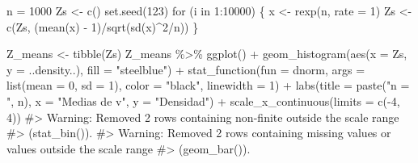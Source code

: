 \documentclass[
  letterpaper,
  DIV=11,
  numbers=noendperiod,
  oneside]{scrreprt}
\newenvironment{Shaded}{\begin{snugshade}}{\end{snugshade}}
\newcommand{\AttributeTok}[1]{\textcolor[rgb]{0.40,0.45,0.13}{#1}}
\newcommand{\CommentTok}[1]{\textcolor[rgb]{0.37,0.37,0.37}{#1}}
\newcommand{\ControlFlowTok}[1]{\textcolor[rgb]{0.00,0.23,0.31}{#1}}
\newcommand{\DecValTok}[1]{\textcolor[rgb]{0.68,0.00,0.00}{#1}}
\newcommand{\FunctionTok}[1]{\textcolor[rgb]{0.28,0.35,0.67}{#1}}
\newcommand{\NormalTok}[1]{\textcolor[rgb]{0.00,0.23,0.31}{#1}}
\newcommand{\OtherTok}[1]{\textcolor[rgb]{0.00,0.23,0.31}{#1}}
\newcommand{\SpecialCharTok}[1]{\textcolor[rgb]{0.37,0.37,0.37}{#1}}
\newcommand{\StringTok}[1]{\textcolor[rgb]{0.13,0.47,0.30}{#1}}
\begin{document}
\begin{Shaded}
\begin{Highlighting}[]
\NormalTok{n }\OtherTok{=} \DecValTok{1000}
\NormalTok{Zs }\OtherTok{\textless{}{-}} \FunctionTok{c}\NormalTok{()}
\FunctionTok{set.seed}\NormalTok{(}\DecValTok{123}\NormalTok{)}
\ControlFlowTok{for}\NormalTok{ (i }\ControlFlowTok{in} \DecValTok{1}\SpecialCharTok{:}\DecValTok{10000}\NormalTok{) \{}
\NormalTok{  x }\OtherTok{\textless{}{-}} \FunctionTok{rexp}\NormalTok{(n, }\AttributeTok{rate =} \DecValTok{1}\NormalTok{)}
\NormalTok{  Zs }\OtherTok{\textless{}{-}} \FunctionTok{c}\NormalTok{(Zs, (}\FunctionTok{mean}\NormalTok{(x) }\SpecialCharTok{{-}} \DecValTok{1}\NormalTok{)}\SpecialCharTok{/}\FunctionTok{sqrt}\NormalTok{(}\FunctionTok{sd}\NormalTok{(x)}\SpecialCharTok{\^{}}\DecValTok{2}\SpecialCharTok{/}\NormalTok{n))}
\NormalTok{\}}

\NormalTok{Z\_means }\OtherTok{\textless{}{-}} \FunctionTok{tibble}\NormalTok{(Zs)}
\NormalTok{Z\_means }\SpecialCharTok{\%\textgreater{}\%} \FunctionTok{ggplot}\NormalTok{() }\SpecialCharTok{+}
  \FunctionTok{geom\_histogram}\NormalTok{(}\FunctionTok{aes}\NormalTok{(}\AttributeTok{x =}\NormalTok{ Zs, }\AttributeTok{y =}\NormalTok{ ..density..), }\AttributeTok{fill =} \StringTok{"steelblue"}\NormalTok{) }\SpecialCharTok{+}
  \FunctionTok{stat\_function}\NormalTok{(}\AttributeTok{fun =}\NormalTok{ dnorm, }\AttributeTok{args =} \FunctionTok{list}\NormalTok{(}\AttributeTok{mean =} \DecValTok{0}\NormalTok{, }\AttributeTok{sd =} \DecValTok{1}\NormalTok{), }
                \AttributeTok{color =} \StringTok{"black"}\NormalTok{, }\AttributeTok{linewidth =} \DecValTok{1}\NormalTok{) }\SpecialCharTok{+}
  \FunctionTok{labs}\NormalTok{(}\AttributeTok{title =} \FunctionTok{paste}\NormalTok{(}\StringTok{"n = "}\NormalTok{, n), }\AttributeTok{x =} \StringTok{"Medias de v"}\NormalTok{, }\AttributeTok{y =} \StringTok{"Densidad"}\NormalTok{) }\SpecialCharTok{+}
  \FunctionTok{scale\_x\_continuous}\NormalTok{(}\AttributeTok{limits =} \FunctionTok{c}\NormalTok{(}\SpecialCharTok{{-}}\DecValTok{4}\NormalTok{, }\DecValTok{4}\NormalTok{))}
\CommentTok{\#\textgreater{} Warning: Removed 2 rows containing non{-}finite outside the scale range}
\CommentTok{\#\textgreater{} (\textasciigrave{}stat\_bin()\textasciigrave{}).}
\CommentTok{\#\textgreater{} Warning: Removed 2 rows containing missing values or values outside the scale range}
\CommentTok{\#\textgreater{} (\textasciigrave{}geom\_bar()\textasciigrave{}).}
\end{Highlighting}
\end{Shaded}
\end{document}
